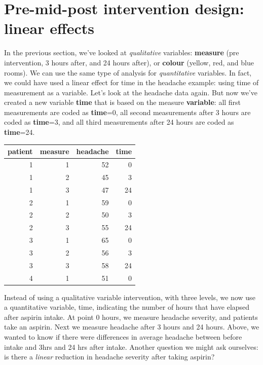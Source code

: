 \documentclass[]{report}\usepackage[]{graphicx}\usepackage[]{color}
\newenvironment{knitrout}{}{} %
\begin{document}
\section{Pre-mid-post intervention design: linear effects}
In the previous section, we've looked at \textit{qualitative} variables: \textbf{measure} (pre intervention, 3 hours after, and 24 hours after), or \textbf{colour} (yellow, red, and blue rooms). We can use the same type of analysis for \textit{quantitative} variables. In fact, we could have used a linear effect for time in the headache example: using time of measurement as a variable. Let's look at the headache data again. But now we've created a new variable \textbf{time} that is based on the measure \textbf{variable}: all first measurements are coded as \textbf{time}=0, all second measurements after 3 hours are coded as \textbf{time}=3, and all third measurements after 24 hours are coded as \textbf{time}=24.

\begin{knitrout}
\color{fgcolor}
\begin{tabular}{r|r|r|r}
\hline
patient & measure & headache & time\\
\hline
1 & 1 & 52 & 0\\
\hline
1 & 2 & 45 & 3\\
\hline
1 & 3 & 47 & 24\\
\hline
2 & 1 & 59 & 0\\
\hline
2 & 2 & 50 & 3\\
\hline
2 & 3 & 55 & 24\\
\hline
3 & 1 & 65 & 0\\
\hline
3 & 2 & 56 & 3\\
\hline
3 & 3 & 58 & 24\\
\hline
4 & 1 & 51 & 0\\
\hline
\end{tabular}


\end{knitrout}
 
 
Instead of using a qualitative variable intervention, with three levels, we now use a quantitative variable, time, indicating the number of hours that have elapsed after aspirin intake. At point 0 hours, we measure headache severity, and patients take an aspirin. Next we measure headache after 3 hours and 24 hours. Above, we wanted to know if there were differences in average headache between before intake and 3hrs and 24 hrs after intake. Another question we might ask ourselves: is there a \textit{linear} reduction in headache severity after taking aspirin?
\end{document}

